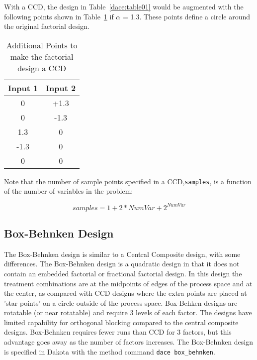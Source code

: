 With a CCD, the design in Table~\ref{dace:table01} would be augmented 
with the following points shown in Table~\ref{dace:table02} 
if $\alpha$ = 1.3. These points define a circle around the original  
factorial design.

\begin{table}[ht]
 \caption{Additional Points to make the factorial design a CCD}
 \label{dace:table02}
 \begin{center}
  \begin{tabular}{c|c}
  \hline
  Input 1            & Input 2         \\ \hline \hline 
  0                 & +1.3             \\ \hline 
  0                 & -1.3           \\ \hline
  1.3                 & 0     \\ \hline
  -1.3                 & 0       \\ \hline
  0                  & 0          \\ \hline
  \end{tabular}
\end{center}
\end{table}

Note that the number of sample points specified in a CCD,\texttt{samples},
is a function of the number of variables in the problem: 

\[
samples = 1 + 2*NumVar + 2^{NumVar}
\]

\subsection{Box-Behnken Design}\label{dace:bb}

The Box-Behnken design is similar to a Central Composite design, with
some differences. The Box-Behnken design is a quadratic design in
that it does not contain an embedded factorial or fractional factorial
design. In this design the treatment combinations are at the midpoints
of edges of the process space and at the center, as compared with CCD
designs where the extra points are placed at 'star points' on a circle
outside of the process space. Box-Behken designs are rotatable (or
near rotatable) and require 3 levels of each factor. The designs have
limited capability for orthogonal blocking compared to the central
composite designs. Box-Behnken requires fewer runs than CCD for 3
factors, but this advantage goes away as the number of factors
increases. The Box-Behnken design is specified in Dakota with the
method command \texttt{dace box\_behnken}.

